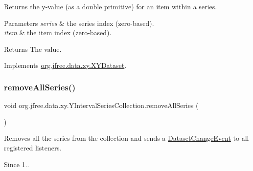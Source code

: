 Returns the y-\/value (as a double primitive) for an item within a series.


\begin{DoxyParams}{Parameters}
{\em series} & the series index (zero-\/based). \\
\hline
{\em item} & the item index (zero-\/based).\\
\hline
\end{DoxyParams}
\begin{DoxyReturn}{Returns}
The value. 
\end{DoxyReturn}


Implements \mbox{\hyperlink{interfaceorg_1_1jfree_1_1data_1_1xy_1_1_x_y_dataset_a5e86389417eb5ed7b663a952ca370914}{org.\+jfree.\+data.\+xy.\+X\+Y\+Dataset}}.

\mbox{\label{classorg_1_1jfree_1_1data_1_1xy_1_1_y_interval_series_collection_a5c365080f096a9672c0c212e7310fd55}} 
\subsubsection{\texorpdfstring{remove\+All\+Series()}{removeAllSeries()}}
{\footnotesize\ttfamily void org.\+jfree.\+data.\+xy.\+Y\+Interval\+Series\+Collection.\+remove\+All\+Series (\begin{DoxyParamCaption}{ }\end{DoxyParamCaption})}

Removes all the series from the collection and sends a \mbox{\hyperlink{}{Dataset\+Change\+Event}} to all registered listeners.

\begin{DoxySince}{Since}
1.. 
\end{DoxySince}
\mbox{\label{classorg_1_1jfree_1_1data_1_1xy_1_1_y_interval_series_collection_a525b80ffdaf045bb55f6ef2ecbf8447c}} 
